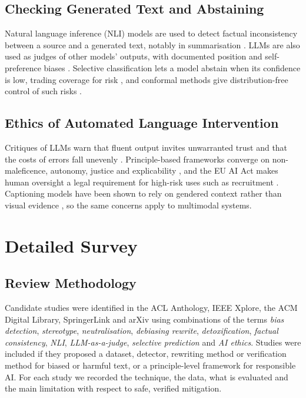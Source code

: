 \documentclass[12pt,a4paper,oneside]{report}
\begin{document}
\subsection{Checking Generated Text and Abstaining}
Natural language inference (NLI) models are used to detect factual inconsistency between a source and a generated text,
notably in summarisation \cite{summac}. LLMs are also used as judges of other models' outputs, with documented position
and self-preference biases \cite{mtbench}. Selective classification lets a model abstain when its confidence is low,
trading coverage for risk \cite{selective}, and conformal methods give distribution-free control of such risks
\cite{conformal}.

\subsection{Ethics of Automated Language Intervention}
Critiques of LLMs warn that fluent output invites unwarranted trust and that the costs of errors fall unevenly
\cite{parrots}. Principle-based frameworks converge on non-maleficence, autonomy, justice and explicability
\cite{floridi,jobin}, and the EU AI Act makes human oversight a legal requirement for high-risk uses such as recruitment
\cite{euaiact}. Captioning models have been shown to rely on gendered context rather than visual evidence
\cite{snowboard}, so the same concerns apply to multimodal systems.

\section{Detailed Survey}

\subsection{Review Methodology}
Candidate studies were identified in the ACL Anthology, IEEE Xplore, the ACM Digital Library, SpringerLink and arXiv
using combinations of the terms \emph{bias detection}, \emph{stereotype}, \emph{neutralisation}, \emph{debiasing
rewrite}, \emph{detoxification}, \emph{factual consistency}, \emph{NLI}, \emph{LLM-as-a-judge}, \emph{selective
prediction} and \emph{AI ethics}. Studies were included if they proposed a dataset, detector, rewriting method or
verification method for biased or harmful text, or a principle-level framework for responsible AI. For each study we
recorded the technique, the data, what is evaluated and the main limitation with respect to safe, verified mitigation.
\end{document}
